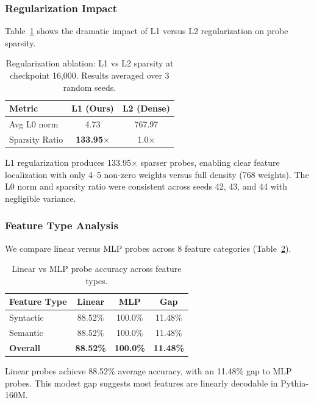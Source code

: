 \documentclass{article}
\begin{document}
\subsubsection{Regularization Impact}

Table~\ref{tab:ablation} shows the dramatic impact of L1 versus L2 regularization on probe sparsity.

\begin{table}[t]
\caption{Regularization ablation: L1 vs L2 sparsity at checkpoint 16,000. Results averaged over 3 random seeds.}
\label{tab:ablation}
\centering
\begin{tabular}{@{}lcc@{}}
\toprule
Metric & L1 (Ours) & L2 (Dense) \\
\midrule
Avg L0 norm & 4.73 & 767.97 \\
Sparsity Ratio & \textbf{133.95}$\times$ & 1.0$\times$ \\
\bottomrule
\end{tabular}
\end{table}

L1 regularization produces 133.95$\times$ sparser probes, enabling clear feature localization with only 4--5 non-zero weights versus full density (768 weights). The L0 norm and sparsity ratio were consistent across seeds 42, 43, and 44 with negligible variance.

\subsubsection{Feature Type Analysis}

We compare linear versus MLP probes across 8 feature categories (Table~\ref{tab:feature_type}).

\begin{table}[t]
\caption{Linear vs MLP probe accuracy across feature types.}
\label{tab:feature_type}
\centering
\begin{tabular}{@{}lccc@{}}
\toprule
Feature Type & Linear & MLP & Gap \\
\midrule
Syntactic & 88.52\% & 100.0\% & 11.48\% \\
Semantic & 88.52\% & 100.0\% & 11.48\% \\
\midrule
\textbf{Overall} & \textbf{88.52\%} & \textbf{100.0\%} & \textbf{11.48\%} \\
\bottomrule
\end{tabular}
\end{table}

Linear probes achieve 88.52\% average accuracy, with an 11.48\% gap to MLP probes. This modest gap suggests most features are linearly decodable in Pythia-160M.
\end{document}
